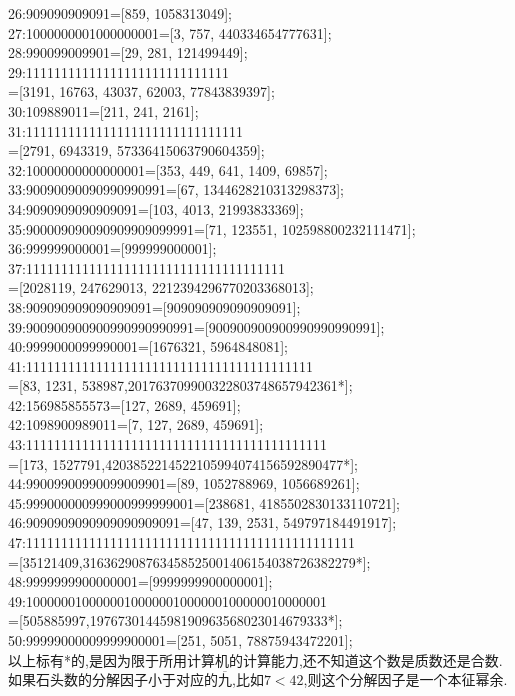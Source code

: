 \documentclass[a4paper]{article}
\numberwithin{equation}{section}
\begin{document}
 26:909090909091=[859, 1058313049];\\
 27:1000000001000000001=[3, 757, 440334654777631];\\
 28:990099009901=[29, 281, 121499449];\\
 29:11111111111111111111111111111 \\ 
 \indent   =[3191, 16763, 43037, 62003, 77843839397];\\
 30:109889011=[211, 241, 2161]; \\
 31:1111111111111111111111111111111 \\ 
  \indent      =[2791, 6943319, 57336415063790604359]; \\
 32:10000000000000001=[353, 449, 641, 1409, 69857];\\
 33:90090090090990990991=[67, 1344628210313298373];\\
 34:9090909090909091=[103, 4013, 21993833369];\\
 35:900009090090909909099991=[71, 123551, 102598800232111471];\\
 36:999999000001=[999999000001];\\
 37:1111111111111111111111111111111111111\\
 \indent      =[2028119, 247629013, 2212394296770203368013];\\
 38:909090909090909091=[909090909090909091];\\
 39:900900900900990990990991=[900900900900990990990991];\\
 40:9999000099990001=[1676321, 5964848081];\\
 41:11111111111111111111111111111111111111111\\
 \indent     =[83, 1231, 538987,201763709900322803748657942361*];\\
 42:156985855573=[127, 2689, 459691]; \\
 42:1098900989011=[7, 127, 2689, 459691]; \\
 43:1111111111111111111111111111111111111111111 \\
 \indent      =[173, 1527791,4203852214522105994074156592890477*]; \\
 44:99009900990099009901=[89, 1052788969, 1056689261];\\
 45:999000000999000999999001=[238681, 4185502830133110721]; \\
 46:9090909090909090909091=[47, 139, 2531, 549797184491917];\\
 47:11111111111111111111111111111111111111111111111\\
 \indent      =[35121409,316362908763458525001406154038726382279*]; \\
 48:9999999900000001=[9999999900000001]; \\
 49:1000000100000010000001000000100000010000001\\
 \indent      =[505885997,1976730144598190963568023014679333*];\\
 50:99999000009999900001=[251, 5051, 78875943472201];\\
 以上标有*的,是因为限于所用计算机的计算能力,还不知道这个数是质数还是合数. 
 如果石头数的分解因子小于对应的$\overline{九}$,比如$7<42$,则这个分解因子是一个本征幂余.
\end{document}
